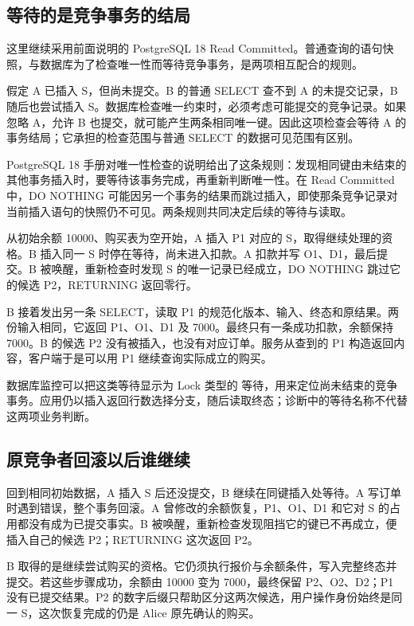 \subsection*{等待的是竞争事务的结局}

这里继续采用前面说明的 PostgreSQL 18 Read Committed。普通查询的语句快照，与数据库为了检查唯一性而等待竞争事务，是两项相互配合的规则。

假定 A 已插入 S，但尚未提交。B 的普通 SELECT 查不到 A 的未提交记录，B 随后也尝试插入 S。数据库检查唯一约束时，必须考虑可能提交的竞争记录。如果忽略 A，允许 B 也提交，就可能产生两条相同唯一键。因此这项检查会等待 A 的事务结局；它承担的检查范围与普通 SELECT 的数据可见范围有区别。

PostgreSQL 18 手册对唯一性检查的说明给出了这条规则：发现相同键由未结束的其他事务插入时，要等待该事务完成，再重新判断唯一性。在 Read Committed 中，DO NOTHING 可能因另一个事务的结果而跳过插入，即使那条竞争记录对当前插入语句的快照仍不可见\cite{pg}。两条规则共同决定后续的等待与读取。



从初始余额 10000、购买表为空开始，A 插入 P1 对应的 S，取得继续处理的资格。B 插入同一 S 时停在等待，尚未进入扣款。A 扣款并写 O1、D1，最后提交。B 被唤醒，重新检查时发现 S 的唯一记录已经成立，DO NOTHING 跳过它的候选 P2，RETURNING 返回零行。

B 接着发出另一条 SELECT，读取 P1 的规范化版本、输入、终态和原结果。两份输入相同，它返回 P1、O1、D1 及 7000。最终只有一条成功扣款，余额保持 7000。B 的候选 P2 没有被插入，也没有对应订单。服务从查到的 P1 构造返回内容，客户端于是可以用 P1 继续查询实际成立的购买。

数据库监控可以把这类等待显示为 Lock 类型的  等待，用来定位尚未结束的竞争事务。应用仍以插入返回行数选择分支，随后读取终态；诊断中的等待名称不代替这两项业务判断。

\subsection*{原竞争者回滚以后谁继续}

回到相同初始数据，A 插入 S 后还没提交，B 继续在同键插入处等待。A 写订单时遇到错误，整个事务回滚。A 曾修改的余额恢复，P1、O1、D1 和它对 S 的占用都没有成为已提交事实。B 被唤醒，重新检查发现阻挡它的键已不再成立，便插入自己的候选 P2；RETURNING 这次返回 P2。



B 取得的是继续尝试购买的资格。它仍须执行报价与余额条件，写入完整终态并提交。若这些步骤成功，余额由 10000 变为 7000，最终保留 P2、O2、D2；P1 没有已提交结果。P2 的数字后缀只帮助区分这两次候选，用户操作身份始终是同一 S，这次恢复完成的仍是 Alice 原先确认的购买。

